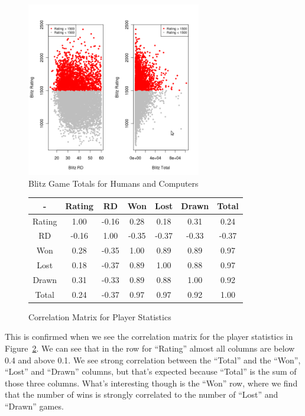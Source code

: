 \documentclass{article}
\begin{document}
\begin{figure} [htp]
\begin{center}
\includegraphics[width=3in]{ratings_rd_total.png}
\end{center}
\caption{Blitz Game Totals for Humans and Computers}
\label{fig:ratingsrdtotal}
\end{figure}

\begin{figure}[htp]
\begin{center}
\begin{tabular}{|c|c|c|c|c|c|c|}
\hline

- & Rating & RD & Won & Lost & Drawn & Total \\
\hline
Rating & 1.00 & -0.16 & 0.28 & 0.18 & 0.31 & 0.24\\
\hline
RD & -0.16 & 1.00 & -0.35 & -0.37 & -0.33 & -0.37\\
\hline
Won & 0.28 & -0.35 & 1.00 & 0.89 & 0.89 & 0.97\\
\hline
Lost & 0.18 & -0.37 & 0.89 & 1.00 & 0.88 & 0.97\\
\hline
Drawn & 0.31 & -0.33 & 0.89 & 0.88 & 1.00 & 0.92\\
\hline
Total & 0.24 & -0.37 & 0.97 & 0.97 & 0.92 & 1.00\\
\hline
\end{tabular}
\end{center}
\caption{Correlation Matrix for Player Statistics}
\label{fig:playercor}
\end{figure}



This is confirmed when we see the correlation matrix for the player statistics in Figure~\ref{fig:playercor}. We can see that in the row for ``Rating'' almost all columns are below 0.4 and above 0.1. We see strong correlation between the ``Total'' and the ``Won'', ``Lost'' and ``Drawn'' columns, but that's expected because ``Total'' is the sum of those three columns. What's interesting though is the ``Won'' row, where we find that the number of wins is strongly correlated to the number of ``Lost'' and ``Drawn'' games. \\
\end{document}
